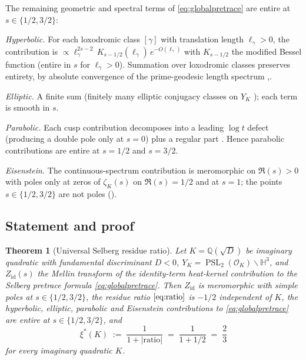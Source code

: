 \documentclass[11pt,a4paper,reqno]{amsart}
\newtheorem{theorem}{Theorem}[section]
\theoremstyle{definition}
\DeclareMathOperator{\PSL}{PSL}
\newcommand{\OK}{\mathcal{O}_K}
\newcommand{\HH}{\mathbb{H}}
\newcommand{\QQ}{\mathbb{Q}}
\newcommand{\YK}{Y_K}
\newcommand{\xis}{\xi^{*}}
\begin{document}
The remaining geometric and spectral terms of \eqref{eq:globalpretrace} are
entire at $s\in\{1/2,3/2\}$:

\emph{Hyperbolic.} For each loxodromic class $[\gamma]$ with translation length
$\ell_\gamma>0$, the contribution is
$\propto \ell_\gamma^{2s-2}\,K_{s-1/2}(\ell_\gamma)\,e^{-O(\ell_\gamma)}$
with $K_{s-1/2}$ the modified Bessel function (entire in $s$ for
$\ell_\gamma>0$).  Summation over loxodromic classes preserves entirety, by
absolute convergence of the prime-geodesic length spectrum
\cite[\S6.4]{ElstrodtGrunewaldMennicke1998},\cite[\S2.2]{BunkeOlbrich1995}.

\emph{Elliptic.} A finite sum (finitely many elliptic conjugacy classes on
$\YK$ \cite[\S2.3]{ElstrodtGrunewaldMennicke1998}); each term is smooth in
$s$.

\emph{Parabolic.} Each cusp contribution decomposes into a leading $\log t$
defect (producing a double pole only at $s=0$) plus a regular part
\cite[\S6.4 + Thm.~6.5]{ElstrodtGrunewaldMennicke1998}.  Hence parabolic
contributions are entire at $s=1/2$ and $s=3/2$.

\emph{Eisenstein.} The continuous-spectrum contribution
\cite[\S6.5]{ElstrodtGrunewaldMennicke1998} is meromorphic on $\Re(s)>0$ with
poles only at zeros of $\zeta_K(s)$ on $\Re(s)=1/2$ and at $s=1$;
the points $s\in\{1/2,3/2\}$ are not poles
(\cite[\S8.2]{ElstrodtGrunewaldMennicke1998}).

\subsection{Statement and proof}\label{ss:Bthm}

\begin{theorem}[Universal Selberg residue ratio]\label{thm:thmB}
Let $K=\QQ(\sqrt{D})$ be imaginary quadratic with fundamental discriminant
$D<0$, $\YK=\PSL_2(\OK)\backslash\HH^3$, and $Z_{\mathrm{id}}(s)$ the Mellin
transform of the identity-term heat-kernel contribution to the Selberg
pretrace formula \eqref{eq:globalpretrace}.  Then $Z_{\mathrm{id}}$ is
meromorphic with simple poles at $s\in\{1/2,3/2\}$, the residue ratio
$\eqref{eq:ratio}$ is $-1/2$ independent of $K$, the hyperbolic, elliptic,
parabolic and Eisenstein contributions to \eqref{eq:globalpretrace} are
entire at $s\in\{1/2,3/2\}$, and
\begin{equation}\label{eq:xistar}
  \xis(K) \;:=\; \frac{1}{1+|\mathrm{ratio}|} \;=\; \frac{1}{1+1/2} \;=\; \frac{2}{3}
\end{equation}
for every imaginary quadratic $K$.
\end{theorem}
\end{document}
